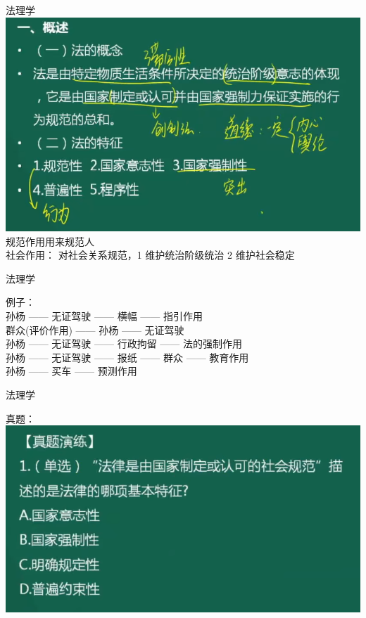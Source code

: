 \documentclass[aspectratio=169]{beamer}
\begin{document}
\begin{frame}[t]{法理学}
    \includegraphics[scale=0.3]{law-intro}\\ 
    规范作用用来规范人\\
    社会作用： 对社会关系规范，1 维护统治阶级统治 2 维护社会稳定
\end{frame}


\begin{frame}[t]{法理学}

    例子：\\
    孙杨 —— 无证驾驶 —— 横幅 ——  指引作用\\
    群众(评价作用) ——  孙杨 —— 无证驾驶 \\
    孙杨 —— 无证驾驶 —— 行政拘留 ——  法的强制作用\\
    孙杨 —— 无证驾驶 —— 报纸 ——  群众 ——  教育作用\\
    孙杨 ——   买车 ——  预测作用\\
\end{frame}

\begin{frame}[t]{法理学}

    真题：\\
    \includegraphics[scale=0.3]{001}\\ 
\end{frame}
\end{document}
